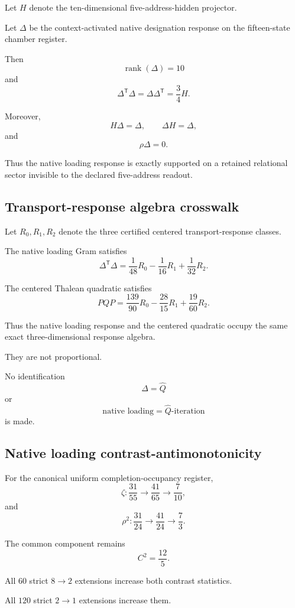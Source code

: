Let \(H\) denote the ten-dimensional five-address-hidden projector.

Let \(\Delta\) be the context-activated native designation response on
the fifteen-state chamber register.

Then
\[
\operatorname{rank}(\Delta)=10
\]
and
\[
\Delta^{\mathsf T}\Delta
=
\Delta\Delta^{\mathsf T}
=
\frac34H.
\]

Moreover,
\[
H\Delta=\Delta,
\qquad
\Delta H=\Delta,
\]
and
\[
\rho\Delta=0.
\]

Thus the native loading response is exactly supported on a retained
relational sector invisible to the declared five-address readout.

\subsection{Transport-response algebra crosswalk}

Let \(R_0,R_1,R_2\) denote the three certified centered
transport-response classes.

The native loading Gram satisfies
\[
\Delta^{\mathsf T}\Delta
=
\frac1{48}R_0
-
\frac1{16}R_1
+
\frac1{32}R_2.
\]

The centered Thalean quadratic satisfies
\[
PQP
=
\frac{139}{90}R_0
-
\frac{28}{15}R_1
+
\frac{19}{60}R_2.
\]

Thus the native loading response and the centered quadratic occupy the
same exact three-dimensional response algebra.

They are not proportional.

No identification
\[
\Delta
=
\widehat Q
\]
or
\[
\text{native loading}
=
\widehat Q\text{-iteration}
\]
is made.

\subsection{Native loading contrast-antimonotonicity}

For the canonical uniform completion-occupancy register,
\[
\zeta:
\frac{31}{55}
\longrightarrow
\frac{41}{65}
\longrightarrow
\frac{7}{10},
\]
and
\[
\rho^2:
\frac{31}{24}
\longrightarrow
\frac{41}{24}
\longrightarrow
\frac73.
\]

The common component remains
\[
C^2=\frac{12}{5}.
\]

All \(60\) strict \(8\to2\) extensions increase both contrast
statistics.

All \(120\) strict \(2\to1\) extensions increase them.


